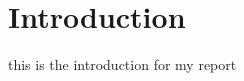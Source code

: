 \documentclass[../main.tex]{subfiles}
\begin{document}
\section{Introduction}

this is the introduction for my report
\end{document}
